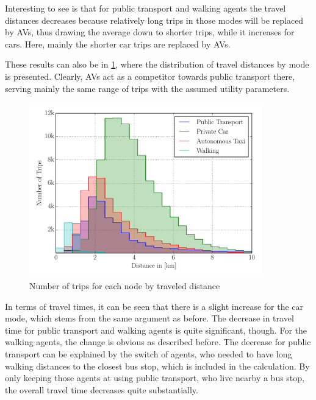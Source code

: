 Interesting to see is that for public transport and walking agents the travel
distances decreases because relatively long trips in those modes will be replaced
by AVs, thus drawing the average down to shorter trips, while it increases for cars.
Here, mainly the shorter car trips are replaced by AVs.

These results can also be in \cref{fig:modehist_av}, where the distribution of
travel distances by mode is presented. Clearly, AVs act as a competitor towards
public transport there, serving mainly the same range of trips with the assumed
utility parameters.

\begin{figure}
    \centering
    \includegraphics[width=0.9\textwidth]{figures/modehist_av.pdf}
    \caption{Number of trips for each node by traveled distance}
    \label{fig:modehist_av}
\end{figure}

In terms of travel times, it can be seen that there is a slight increase for the car
mode, which stems from the same argument as before. The decrease in travel time for
public transport and walking agents is quite significant, though. For the walking
agents, the change is obvious as described before. The decrease for public transport
can be explained by the switch of agents, who needed to have long walking distances
to the closest bus stop, which is included in the calculation. By only keeping those
agents at using public transport, who live nearby a bus stop, the overall travel
time decreases quite substantially.

